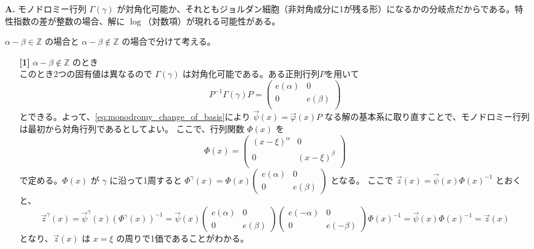 \begin{Q}
\textbf{A.} モノドロミー行列 $\Gamma(\gamma)$ が対角化可能か、それともジョルダン細胞（非対角成分に1が残る形）になるかの分岐点だからである。特性指数の差が整数の場合、解に $\log$（対数項）が現れる可能性がある。
\end{Q}

$\alpha-\beta \in \mathbb{Z}$ の場合と $\alpha-\beta \not\in \mathbb{Z}$ の場合で分けて考える。

\begin{itemize}
    \item[\textbf{[1]}] $\alpha-\beta \notin \mathbb{Z}$ のとき\\
    このとき2つの固有値は異なるので $\Gamma(\gamma)$ は対角化可能である。ある正則行列$P$を用いて
    \[
    P^{-1}\Gamma(\gamma)P=
    \begin{pmatrix}
        e(\alpha) & 0 \\
        0 & e(\beta) \\
    \end{pmatrix}
    \]
    とできる。よって、\eqref{eq:monodromy_change_of_basis}により $\vec{\psi}(x)=\vec{\varphi}(x)P$ なる解の基本系に取り直すことで、モノドロミー行列は最初から対角行列であるとしてよい。
    ここで、行列関数 $\Phi(x)$ を
    \[
    \Phi(x)=
    \begin{pmatrix}
        (x-\xi)^{\alpha} & 0 \\
        0 & (x-\xi)^{\beta} \\
    \end{pmatrix}
    \]
    で定める。$\Phi(x)$ が $\gamma$ に沿って1周すると $\Phi^{\gamma}(x) = \Phi(x) \begin{pmatrix} e(\alpha) & 0 \\ 0 & e(\beta) \end{pmatrix}$ となる。
    ここで $\vec{z}(x)=\vec{\psi}(x)\Phi(x)^{-1}$ とおくと、
    \[
    \vec{z}^{\gamma}(x) = \vec{\psi}^{\gamma}(x)\left(\Phi^{\gamma}(x)\right)^{-1} 
    = \vec{\psi}(x)\begin{pmatrix} e(\alpha) & 0 \\ 0 & e(\beta) \end{pmatrix} \begin{pmatrix} e(-\alpha) & 0 \\ 0 & e(-\beta) \end{pmatrix}\Phi(x)^{-1} 
    = \vec{\psi}(x)\Phi(x)^{-1} = \vec{z}(x)
    \]
    となり、$\vec{z}(x)$ は $x=\xi$ の周りで1価であることがわかる。


\end{itemize}

